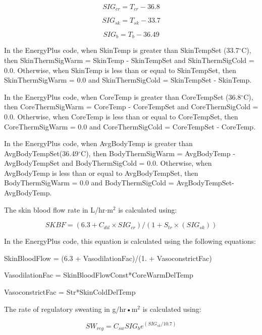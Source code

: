 \begin{equation}
SI{G_{cr}} = {T_{cr}} - 36.8
\end{equation}

\begin{equation}
SI{G_{sk}} = {T_{sk}} - 33.7
\end{equation}

\begin{equation}
SI{G_b} = {T_b} - 36.49
\end{equation}

In the EnergyPlus code, when SkinTemp is greater than SkinTempSet (33.7$^{\circ}$C), then SkinThermSigWarm = SkinTemp - SkinTempSet and
SkinThermSigCold = 0.0. Otherwise, when SkinTemp is less than or equal to SkinTempSet, then SkinThermSigWarm = 0.0 and SkinThermSigCold = SkinTempSet - SkinTemp.

In the EnergyPlus code, when CoreTemp is greater than CoreTempSet (36.8$^{\circ}$C), then CoreThermSigWarm = CoreTemp - CoreTempSet and CoreThermSigCold = 0.0. Otherwise, when CoreTemp is less than or equal to CoreTempSet, then CoreThermSigWarm = 0.0 and CoreThermSigCold = CoreTempSet - CoreTemp.

In the EnergyPlus code, when AvgBodyTemp is greater than AvgBodyTempSet(36.49$^{\circ}$C), then BodyThermSigWarm = AvgBodyTemp - AvgBodyTempSet and BodyThermSigCold = 0.0. Otherwise, when AvgBodyTemp is less than or equal to AvgBodyTempSet, then BodyThermSigWarm = 0.0 and BodyThermSigCold = AvgBodyTempSet-AvgBodyTemp.

The skin blood flow rate in L/hr$\cdot$m\(^{2}\) is calculated using:

\begin{equation}
SKBF = (6.3 + C{}_{dil} \times SI{G_{cr}})/(1 + {S_{tr}} \times (SI{G_{sk}}))
\end{equation}

In the EnergyPlus code, this equation is calculated using the following equations:

SkinBloodFlow = (6.3 + VasodilationFac)/(1. + VasoconstrictFac)

VasodilationFac = SkinBloodFlowConst*CoreWarmDelTemp

VasoconstrictFac = Str*SkinColdDelTemp

The rate of regulatory sweating in g/hr•m\(^{2}\) is calculated using:

\begin{equation}
S{W_{reg}} = {C_{sw}}SI{G_b}{e^{(SI{G_{sk}}/10.7)}}
\end{equation}

